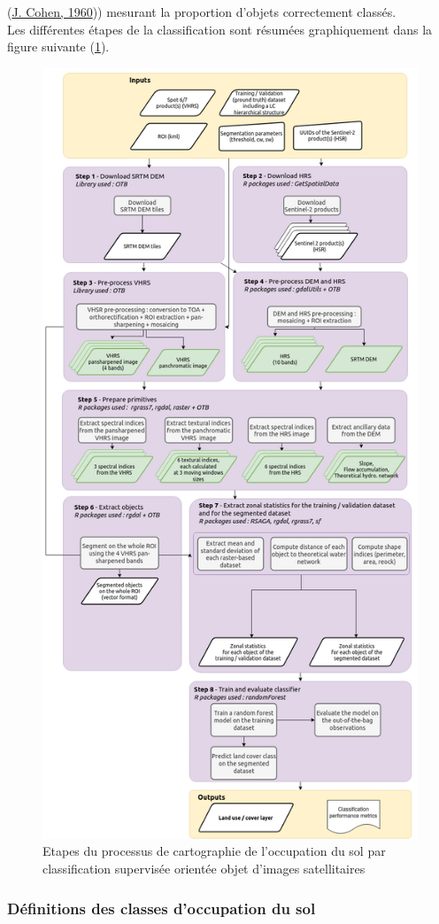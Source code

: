 \documentclass[12pt,twoside]{reedthesis}
\begin{document}
(\protect\hyperlink{ref-cohen_coefficient_1960}{J. Cohen, 1960})) mesurant la proportion d'objets correctement classés.\\

Les différentes étapes de la classification sont résumées graphiquement dans la figure suivante (\ref{fig:workflow-obia}).
\begin{figure}

{\centering \includegraphics[width=0.7\linewidth]{figure/obia_workflow} 

}

\caption[Etapes du processus de cartographie de l'occupation du sol par classification supervisée orientée objet d'images satellitaires]{Etapes du processus de cartographie de l'occupation du sol par classification supervisée orientée objet d'images satellitaires}\label{fig:workflow-obia}
\end{figure}
\hypertarget{duxe9finitions-des-classes-doccupation-du-sol}{%
\subsubsection{Définitions des classes d'occupation du sol}\label{duxe9finitions-des-classes-doccupation-du-sol}}
\end{document}
